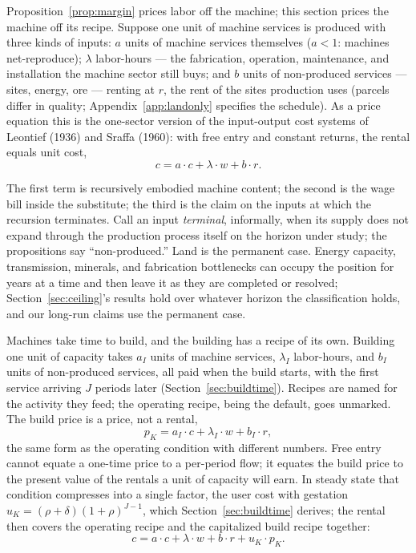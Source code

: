 \documentclass[12pt]{article}
\theoremstyle{plain}
\begin{document}
Proposition~\ref{prop:margin} prices labor off the machine; this section prices the machine off its recipe. Suppose one unit of machine services is produced with three kinds of inputs: $a$ units of machine services themselves ($a < 1$: machines net-reproduce); $\lambda$ labor-hours --- the fabrication, operation, maintenance, and installation the machine sector still buys; and $b$ units of non-produced services --- sites, energy, ore --- renting at $r$, the rent of the sites production uses (parcels differ in quality; Appendix~\ref{app:landonly} specifies the schedule). As a price equation this is the one-sector version of the input-output cost systems of Leontief (1936) and Sraffa (1960): with free entry and constant returns, the rental equals unit cost,
\begin{equation}\label{eq:recursion}
c = a\cdot c + \lambda \cdot w + b\cdot r.
\end{equation}

The first term is recursively embodied machine content; the second is the wage bill inside the substitute; the third is the claim on the inputs at which the recursion terminates. Call an input \emph{terminal}, informally, when its supply does not expand through the production process itself on the horizon under study; the propositions say ``non-produced.'' Land is the permanent case. Energy capacity, transmission, minerals, and fabrication bottlenecks can occupy the position for years at a time and then leave it as they are completed or resolved; Section~\ref{sec:ceiling}'s results hold over whatever horizon the classification holds, and our long-run claims use the permanent case.

Machines take time to build, and the building has a recipe of its own. Building one unit of capacity takes $a_I$ units of machine services, $\lambda _I$ labor-hours, and $b_I$ units of non-produced services, all paid when the build starts, with the first service arriving $J$ periods later (Section~\ref{sec:buildtime}). Recipes are named for the activity they feed; the operating recipe, being the default, goes unmarked. The build price is a price, not a rental,
\begin{equation}\label{eq:build-price}
p_K = a_I\cdot c + \lambda _I\cdot w + b_I\cdot r,
\end{equation}
the same form as the operating condition with different numbers. Free entry cannot equate a one-time price to a per-period flow; it equates the build price to the present value of the rentals a unit of capacity will earn. In steady state that condition compresses into a single factor, the user cost with gestation $u_K = (\rho +\delta )(1+\rho )^{J-1}$, which Section~\ref{sec:buildtime} derives; the rental then covers the operating recipe and the capitalized build recipe together:
\begin{equation}\label{eq:recursion-uK}
c = a\cdot c + \lambda \cdot w + b\cdot r + u_K\cdot p_K.
\end{equation}
\end{document}
